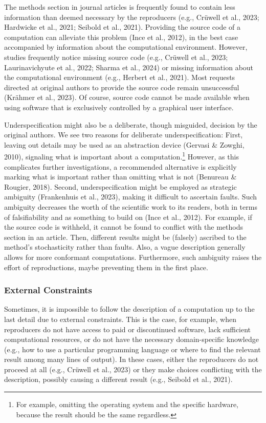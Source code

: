 \documentclass[authordate, meta]{jote-new-article}
\begin{document}
	The methods section in journal articles is frequently found to contain less information than deemed necessary by the reproducers (e.g., Crüwell et al., 2023; Hardwicke et al., 2021; Seibold et al., 2021). Providing the source code of a computation can alleviate this problem (Ince et al., 2012), in the best case accompanied by information about the computational environment. However, studies frequently notice missing source code (e.g., Crüwell et al., 2023; Laurinavichyute et al., 2022; Sharma et al., 2024) or missing information about the computational environment (e.g., Herbert et al., 2021). Most requests directed at original authors to provide the source code remain unsuccessful (Krähmer et al., 2023). Of course, source code cannot be made available when using software that is exclusively controlled by a graphical user interface.



	Underspecification might also be a deliberate, though misguided, decision by the original authors. We see two reasons for deliberate underspecification: First, leaving out details may be used as an abstraction device (Gervasi \& Zowghi, 2010), signaling what is important about a computation.\footnote{ For example, omitting the operating system and the specific hardware, because the result should be the same regardless.} However, as this complicates further investigations, a recommended alternative is explicitly marking what is important rather than omitting what is not (Benureau \& Rougier, 2018). Second, underspecification might be employed as strategic ambiguity (Frankenhuis et al., 2023), making it difficult to ascertain faults. Such ambiguity decreases the worth of the scientific work to its readers, both in terms of falsifiability and as something to build on (Ince et al., 2012). For example, if the source code is withheld, it cannot be found to conflict with the methods section in an article. Then, different results might be (falsely) ascribed to the method's stochasticity rather than faults. Also, a vague description generally allows for more conformant computations. Furthermore, such ambiguity raises the effort of reproductions, maybe preventing them in the first place.



	\subsubsection{External Constraints}



	Sometimes, it is impossible to follow the description of a computation up to the last detail due to external constraints. This is the case, for example, when reproducers do not have access to paid or discontinued software, lack sufficient computational resources, or do not have the necessary domain-specific knowledge (e.g., how to use a particular programming language or where to find the relevant result among many lines of output). In these cases, either the reproducers do not proceed at all (e.g., Crüwell et al., 2023) or they make choices conflicting with the description, possibly causing a different result (e.g., Seibold et al., 2021).
\end{document}
